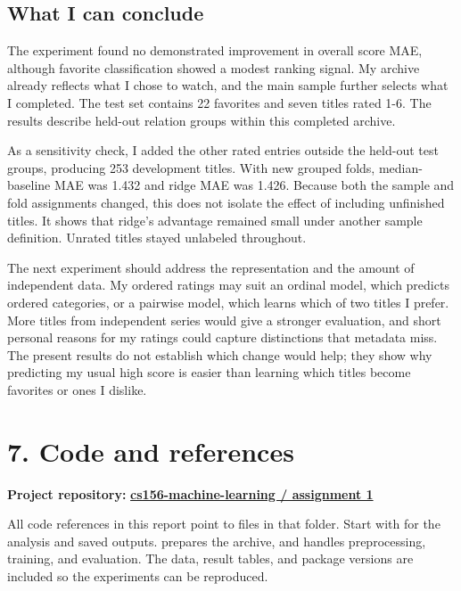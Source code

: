 \documentclass[10pt,a4paper]{article}
\begin{document}
\subsection*{What I can conclude}
The experiment found no demonstrated improvement in overall score MAE, although favorite classification showed a modest ranking signal. My archive already reflects what I chose to watch, and the main sample further selects what I completed. The test set contains 22 favorites and seven titles rated 1-6. The results describe held-out relation groups within this completed archive.

As a sensitivity check, I added the other rated entries outside the held-out test groups, producing 253 development titles. With new grouped folds, median-baseline MAE was 1.432 and ridge MAE was 1.426. Because both the sample and fold assignments changed, this does not isolate the effect of including unfinished titles. It shows that ridge's advantage remained small under another sample definition. Unrated titles stayed unlabeled throughout.

The next experiment should address the representation and the amount of independent data. My ordered ratings may suit an ordinal model, which predicts ordered categories, or a pairwise model, which learns which of two titles I prefer. More titles from independent series would give a stronger evaluation, and short personal reasons for my ratings could capture distinctions that metadata miss. The present results do not establish which change would help; they show why predicting my usual high score is easier than learning which titles become favorites or ones I dislike.

\clearpage

\section*{7. Code and references}
\textbf{Project repository: }
\href{https://github.com/pekkimori/cs156-machine-learning/tree/main/assignment\%201}{\textbf{cs156-machine-learning / assignment 1}}

All code references in this report point to files in that folder. Start with  for the analysis and saved outputs.  prepares the archive, and  handles preprocessing, training, and evaluation. The data, result tables, and package versions are included so the experiments can be reproduced.
\end{document}
